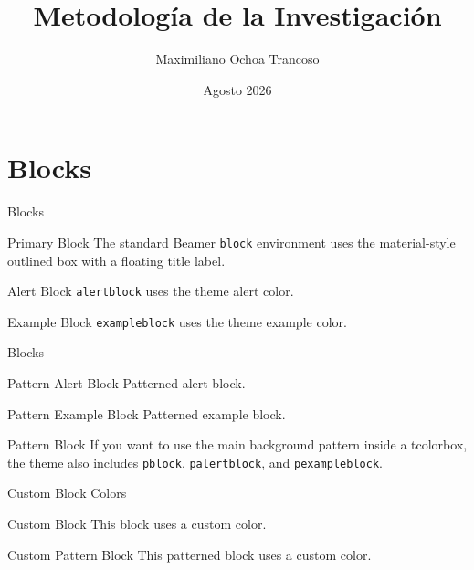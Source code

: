 \documentclass[aspectratio=169]{beamer}
\title{Metodología de la Investigación}
\date{Agosto 2026}
\author{Maximiliano Ochoa Trancoso}
\begin{document}
    \begin{frame}
    \titlepage
    \end{frame}
    


    \begin{frame}[plain]
        \tableofcontents
    \end{frame}

\section{Blocks}

    \begin{frame}{Blocks}
        
        \begin{block}{Primary Block}
            The standard Beamer \texttt{block} environment uses the material-style outlined box with a floating title label.
        \end{block}
        \begin{alertblock}{Alert Block}
            \texttt{alertblock} uses the theme alert color.
        \end{alertblock}
        \begin{exampleblock}{Example Block}
            \texttt{exampleblock} uses the theme example color.
        \end{exampleblock}
    
    \end{frame}
    
    \begin{frame}{Blocks}
        \begin{palertblock}{Pattern Alert Block}
            Patterned alert block.
        \end{palertblock}
        \begin{pexampleblock}{Pattern Example Block}
            Patterned example block.
        \end{pexampleblock}
        \begin{pblock}{Pattern Block}
        If you want to use the main background pattern inside a tcolorbox, the theme also includes \texttt{pblock}, \texttt{palertblock}, and \texttt{pexampleblock}.
        \end{pblock}
    \end{frame}
    
    \begin{frame}{Custom Block Colors}
        \begin{mblock}[colframe=HarvestOrange,coltitle=HarvestOrange]{Custom Block}
            This block uses a custom color.
        \end{mblock}
        \begin{pblock}[VintageLavender]{Custom Pattern Block}
            This patterned block uses a custom color.
        \end{pblock}
    \end{frame}
\end{document}
